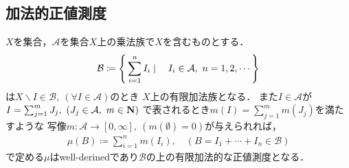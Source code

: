 \subsection{加法的正値測度}
		\begin{screen}
			\begin{thm}[有限加法的な正値測度空間の生成]\label{thm:forming_finitely_additive_class}
				$X$を集合，$\mathcal{A}$を集合$X$上の乗法族で$X$を含むものとする．
				\begin{align}
					\mathcal{B} \coloneqq \left\{\, \sum_{i=1}^n I_i \mid \quad I_i \in \mathcal{A},\ n=1,2,\cdots\, \right\}
				\end{align}
				は$X\backslash I \in \mathcal{B},\ (\forall I \in \mathcal{A})$のとき
				$X$上の有限加法族となる．
				また$I \in \mathcal{A}$が$I = \sum_{j=1}^m J_j,\ (J_j \in \mathcal{A},\ m \in \mathbf{N})$
				で表されるとき$m(I) = \sum_{j=1}^m m(J_j)$を満たすような
				写像$m:\mathcal{A} \longrightarrow [0,\infty],\ (m(\emptyset)=0)$が与えられれば，
				\begin{align}
					\mu(B) \coloneqq \sum_{i=1}^n m(I_i),
					\quad (B=I_1 + \cdots + I_n \in \mathcal{B})
				\end{align}
				で定める$\mu$はwell-derinedであり$\mathcal{B}$の上の有限加法的な正値測度となる．
			\end{thm}
		\end{screen}
		
